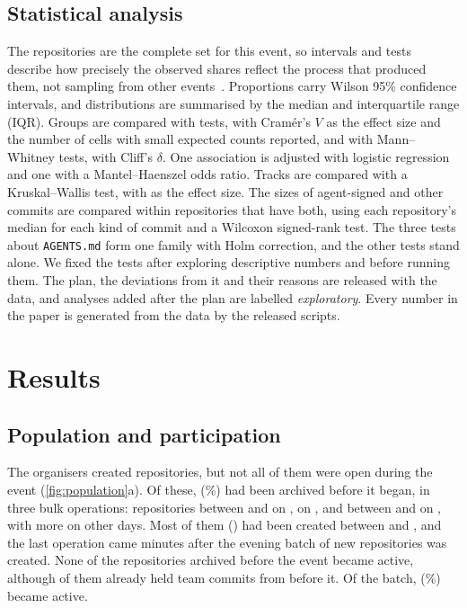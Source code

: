 \documentclass{article}
\begin{document}
\subsection{Statistical analysis}
The repositories are the complete set for this event, so intervals and tests describe how precisely the observed shares reflect the process that produced them, not sampling from other events~\cite{baltes2022sampling}. Proportions carry Wilson 95\% confidence intervals, and distributions are summarised by the median and interquartile range (IQR). Groups are compared with \chisq{} tests, with Cramér's $V$ as the effect size and the number of cells with small expected counts reported, and with Mann--Whitney tests, with Cliff's $\delta$. One association is adjusted with logistic regression and one with a Mantel--Haenszel odds ratio. Tracks are compared with a Kruskal--Wallis test, with \epsqformula{} as the effect size. The sizes of agent-signed and other commits are compared within repositories that have both, using each repository's median for each kind of commit and a Wilcoxon signed-rank test. The three tests about \texttt{AGENTS.md} form one family with Holm correction, and the other tests stand alone. We fixed the tests after exploring descriptive numbers and before running them. The plan, the deviations from it and their reasons are released with the data, and analyses added after the plan are labelled \emph{exploratory}. Every number in the paper is generated from the data by the released scripts.

\section{Results}\label{sec:results}

\subsection{Population and participation}\label{sec:population}

The organisers created \NRqOneTotal{} repositories, but not all of them were open during the event (\cref{fig:population}a). Of these, \NRqOnePrearchivedN{} (\NRqOnePrearchivedPct\%) had been archived before it began, in three bulk operations: \NRqOnePrearchivedClustersSepOneFiveN{} repositories between \NRqOnePrearchivedClustersSepOneFiveFirst{} and \NRqOnePrearchivedClustersSepOneFiveLast{} on \sepfifteen, \NRqOnePrearchivedClustersSepOneSevenN{} on \sepseventeen{}, and \NRqOnePrearchivedClustersSepTwoTwoN{} between \NRqOnePrearchivedClustersSepTwoTwoFirst{} and \NRqOnePrearchivedClustersSepTwoTwoLast{} on \batchday{}, with \NRqOnePrearchivedOther{} more on other days. Most of them (\NRqOnePrearchivedCreatedSepOneFiveTwoOne) had been created between \sepfifteen{} and \septwentyone{}, and the last operation came minutes after the evening batch of \NRqOneBatchN{} new repositories was created. None of the repositories archived before the event became active, although \NRqOnePrearchivedWithCommits{} of them already held team commits from before it. Of the batch, \NRqOneBatchActiveN{} (\NRqOneBatchActivePct\%) became active.
\end{document}
